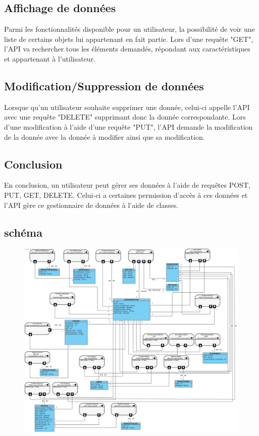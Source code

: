 \subsection{Affichage de données}
\begin{flushleft}
Parmi les fonctionnalités disponible pour un utilisateur, la possibilité de voir une liste de certains objets lui appartenant en fait partie. Lors d'une requête "GET", l'API va rechercher tous les éléments demandés, répondant aux caractéristiques et appartenant à l'utilisateur.
\end{flushleft}

\subsection{Modification/Suppression de données}
\begin{flushleft}
Lorsque qu'un utilisateur souhaite supprimer une donnée, celui-ci appelle l'API avec une requête "DELETE" supprimant donc la donnée correspondante. Lors d'une modification à l'aide d'une requête "PUT", l'API demande la modification de la donnée avec la donnée à modifier ainsi que sa modification.
\end{flushleft}

\subsection{Conclusion}
\begin{flushleft}
En conclusion, un utilisateur peut gérer ses données à l'aide de requêtes POST, PUT, GET, DELETE. Celui-ci a certaines permission d'accès à ces données et l'API gère ce gestionnaire de données à l'aide de classes.
\newpage

\end{flushleft}
\subsection{schéma}
\begin{figure}[h]
\includegraphics[scale=0.2]{Base/api-rest/img/apirest.jpg}
\end{figure}

